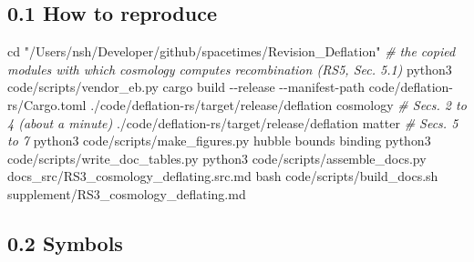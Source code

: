 \documentclass[
  10pt,
]{article}
\newenvironment{Shaded}{}{}
\newcommand{\AttributeTok}[1]{\textcolor[rgb]{0.49,0.56,0.16}{#1}}
\newcommand{\BuiltInTok}[1]{\textcolor[rgb]{0.00,0.50,0.00}{#1}}
\newcommand{\CommentTok}[1]{\textcolor[rgb]{0.38,0.63,0.69}{\textit{#1}}}
\newcommand{\ExtensionTok}[1]{#1}
\newcommand{\FunctionTok}[1]{\textcolor[rgb]{0.02,0.16,0.49}{#1}}
\newcommand{\NormalTok}[1]{#1}
\newcommand{\StringTok}[1]{\textcolor[rgb]{0.25,0.44,0.63}{#1}}
\begin{document}
\hypertarget{how-to-reproduce}{%
\subsection{0.1 How to reproduce}\label{how-to-reproduce}}

\begin{Shaded}
\begin{Highlighting}[]
\BuiltInTok{cd} \StringTok{"/Users/nsh/Developer/github/spacetimes/Revision\_Deflation"}
\CommentTok{\# the copied modules with which \textasciigrave{}cosmology\textasciigrave{} computes recombination (RS5, Sec. 5.1)}
\ExtensionTok{python3}\NormalTok{ code/scripts/vendor\_eb.py}
\ExtensionTok{cargo}\NormalTok{ build }\AttributeTok{{-}{-}release} \AttributeTok{{-}{-}manifest{-}path}\NormalTok{ code/deflation{-}rs/Cargo.toml}
\ExtensionTok{./code/deflation{-}rs/target/release/deflation}\NormalTok{ cosmology   }\CommentTok{\# Secs. 2 to 4 (about a minute)}
\ExtensionTok{./code/deflation{-}rs/target/release/deflation}\NormalTok{ matter      }\CommentTok{\# Secs. 5 to 7}
\ExtensionTok{python3}\NormalTok{ code/scripts/make\_figures.py hubble bounds binding}
\ExtensionTok{python3}\NormalTok{ code/scripts/write\_doc\_tables.py}
\ExtensionTok{python3}\NormalTok{ code/scripts/assemble\_docs.py docs\_src/RS3\_cosmology\_deflating.src.md}
\FunctionTok{bash}\NormalTok{ code/scripts/build\_docs.sh supplement/RS3\_cosmology\_deflating.md}
\end{Highlighting}
\end{Shaded}

\hypertarget{symbols}{%
\subsection{0.2 Symbols}\label{symbols}}
\end{document}

